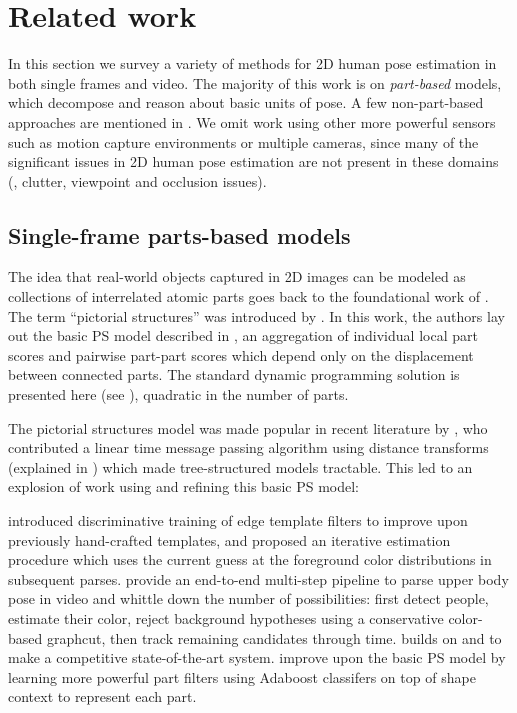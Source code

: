\chapter{Related work}

In this section we survey a variety of methods for 2D human pose estimation in 
both single frames and video.  The majority of this work is on {\em part-based} 
models, which decompose and reason about basic units of pose.  A few 
non-part-based approaches are mentioned in .  We omit work 
using other more powerful sensors such as motion capture environments or 
multiple cameras, since many of the significant issues in 2D human pose 
estimation are not present in these domains (\eg, clutter, viewpoint and 
occlusion issues).

\section{Single-frame parts-based models}\label{sec:partsbased}

The idea that real-world objects captured in 2D images can be modeled as 
collections of interrelated atomic parts goes back to the foundational work of 
\citet{binford71}. The term ``pictorial structures'' was introduced by 
\citet{fischler1973ps}.  In this work, the authors lay out the basic PS model 
described in , an aggregation of individual local part scores and 
pairwise part-part scores which depend only on the displacement between 
connected parts.  The standard dynamic programming solution is presented here 
(see ), quadratic in the number of parts.  

The pictorial structures model was made popular in recent literature by 
\citet{felz05}, who contributed a linear time message passing algorithm using 
distance transforms (explained in ) which made tree-structured 
models tractable.  This led to an explosion of work using and refining this 
basic PS model:

\citet{devaparse} introduced discriminative training of edge template filters 
to improve upon previously hand-crafted templates, and proposed an iterative 
estimation procedure which uses the current guess at the foreground color 
distributions in subsequent parses.  \citet{ferrari08} provide an end-to-end 
multi-step pipeline to parse upper body pose in video and whittle down the 
number of possibilities: first detect people, estimate their color, reject 
background hypotheses using a conservative color-based graphcut, then track 
remaining candidates through time.  \citet{eichner-tr} builds on 
\citet{ferrari08} and \citet{devaparse} to make a competitive state-of-the-art 
system.  \citet{andriluka09} improve upon the basic PS model by learning more 
powerful part filters using Adaboost classifers on top of shape context to 
represent each part.

